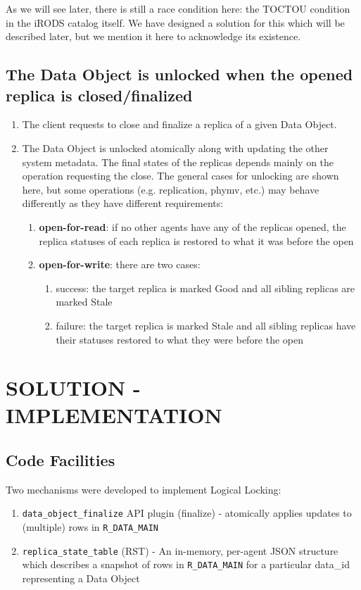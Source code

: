 \documentclass{irodsugm}
\begin{document}
As we will see later, there is still a race condition here: the TOCTOU\cite{toctou} condition in the iRODS catalog itself. We have designed a solution for this which will be described later, but we mention it here to acknowledge its existence.

\subsection*{The Data Object is unlocked when the opened replica is closed/finalized}

\begin{enumerate}
\item The client requests to close and finalize a replica of a given Data Object.
\item The Data Object is unlocked atomically along with updating the other system metadata. The final states of the replicas depends mainly on the operation requesting the close. The general cases for unlocking are shown here, but some operations (e.g. replication, phymv, etc.) may behave differently as they have different requirements:
   \begin{enumerate}
   \item \textbf{open-for-read}: if no other agents have any of the replicas opened, the replica statuses of each replica is restored to what it was before the open
   \item \textbf{open-for-write}: there are two cases:
      \begin{enumerate}
      \item success: the target replica is marked Good and all sibling replicas are marked Stale
      \item failure: the target replica is marked Stale and all sibling replicas have their statuses restored to what they were before the open
      \end{enumerate}
   \end{enumerate}
\end{enumerate}

\section*{SOLUTION - IMPLEMENTATION}
\subsection*{Code Facilities}
Two mechanisms were developed to implement Logical Locking:

\begin{enumerate}
\item \texttt{data\_object\_finalize} API plugin (finalize) - atomically applies updates to (multiple) rows in \texttt{R\_DATA\_MAIN}
\item \texttt{replica\_state\_table} (RST) - An in-memory, per-agent JSON structure which describes a snapshot of rows in \texttt{R\_DATA\_MAIN} for a particular data\_id representing a Data Object
\end{enumerate}
\end{document}
